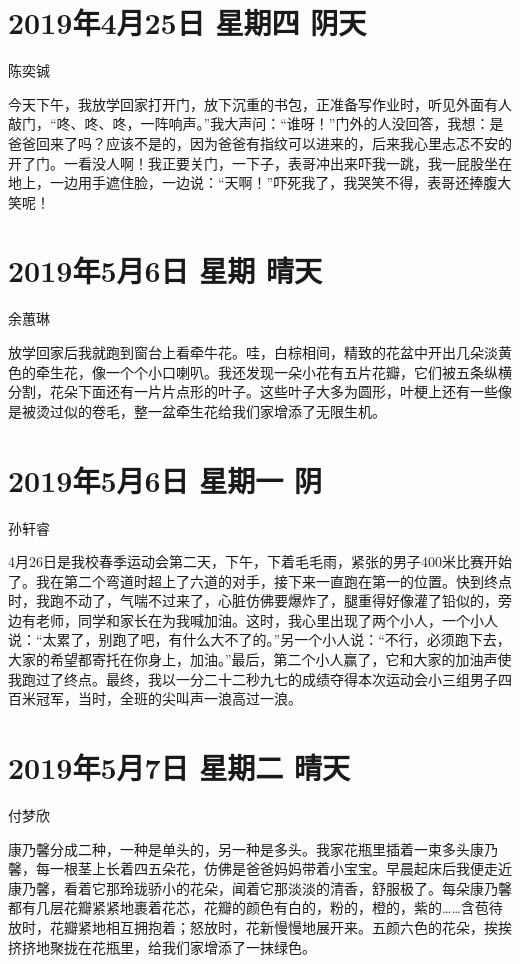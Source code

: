 \section{2019年4月25日 星期四 阴天}

陈奕铖

今天下午，我放学回家打开门，放下沉重的书包，正准备写作业时，听见外面有人敲门，``咚、咚、咚，一阵响声。''我大声问：``谁呀！''门外的人没回答，我想：是爸爸回来了吗？应该不是的，因为爸爸有指纹可以进来的，后来我心里忐忑不安的开了门。一看没人啊！我正要关门，一下子，表哥冲出来吓我一跳，我一屁股坐在地上，一边用手遮住脸，一边说：``天啊！''吓死我了，我哭笑不得，表哥还捧腹大笑呢！

\section{2019年5月6日 星期 晴天}

余蕙琳

放学回家后我就跑到窗台上看牵牛花。哇，白棕相间，精致的花盆中开出几朵淡黄色的牵生花，像一个个小口喇叭。我还发现一朵小花有五片花瓣，它们被五条纵横分割，花朵下面还有一片片点形的叶子。这些叶子大多为圆形，叶梗上还有一些像是被烫过似的卷毛，整一盆牵生花给我们家增添了无限生机。

\section{2019年5月6日 星期一 阴}

孙轩睿

4月26日是我校春季运动会第二天，下午，下着毛毛雨，紧张的男子400米比赛开始了。我在第二个弯道时超上了六道的对手，接下来一直跑在第一的位置。快到终点时，我跑不动了，气喘不过来了，心脏仿佛要爆炸了，腿重得好像灌了铅似的，旁边有老师，同学和家长在为我喊加油。这时，我心里出现了两个小人，一个小人说：``太累了，别跑了吧，有什么大不了的。''另一个小人说：``不行，必须跑下去，大家的希望都寄托在你身上，加油。''最后，第二个小人赢了，它和大家的加油声使我跑过了终点。最终，我以一分二十二秒九七的成绩夺得本次运动会小三组男子四百米冠军，当时，全班的尖叫声一浪高过一浪。

\section{2019年5月7日 星期二 晴天}

付梦欣

康乃馨分成二种，一种是单头的，另一种是多头。我家花瓶里插着一束多头康乃馨，每一根茎上长着四五朵花，仿佛是爸爸妈妈带着小宝宝。早晨起床后我便走近康乃馨，看着它那玲珑骄小的花朵，闻着它那淡淡的清香，舒服极了。每朵康乃馨都有几层花瓣紧紧地裹着花芯，花瓣的颜色有白的，粉的，橙的，紫的\ldots{}\ldots{}含苞待放时，花瓣紧地相互拥抱着；怒放时，花新慢慢地展开来。五颜六色的花朵，挨挨挤挤地聚拢在花瓶里，给我们家增添了一抹绿色。

